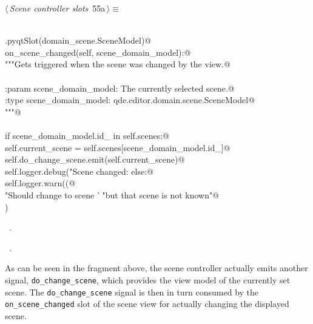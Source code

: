 \documentclass[
    a4paper,      %
    10pt,         %
    openright,    %
    notitlepage,  %
    parskip=half, %
]{scrreprt}       %
\theoremstyle{definition}                    %
\begin{document}
\begin{flushleft} \small
\begin{minipage}{\linewidth}\label{scrap87}\raggedright\small
{} $\langle\,${\itshape Scene controller slots}\nobreak\ {\footnotesize {55a}}$\,\rangle\equiv$
\vspace{-1ex}
\begin{list}{}{} \item
\mbox{}\lstinline@@\\
\mbox{}\lstinline@QtCore.pyqtSlot(domain_scene.SceneModel)@\\
\mbox{}\lstinline@def on_scene_changed(self, scene_domain_model):@\\
\mbox{}\lstinline@    """Gets triggered when the scene was changed by the view.@\\
\mbox{}\lstinline@@\\
\mbox{}\lstinline@    :param scene_domain_model: The currently selected scene.@\\
\mbox{}\lstinline@    :type  scene_domain_model: qde.editor.domain.scene.SceneModel@\\
\mbox{}\lstinline@    """@\\
\mbox{}\lstinline@@\\
\mbox{}\lstinline@    if scene_domain_model.id_ in self.scenes:@\\
\mbox{}\lstinline@        self.current_scene = self.scenes[scene_domain_model.id_]@\\
\mbox{}\lstinline@        self.do_change_scene.emit(self.current_scene)@\\
\mbox{}\lstinline@        self.logger.debug("Scene changed: %s", self.current_scene)@\\
\mbox{}\lstinline@    else:@\\
\mbox{}\lstinline@        self.logger.warn((@\\
\mbox{}\lstinline@            "Should change to scene '%s', "@\\
\mbox{}\lstinline@            "but that scene is not known"@\\
\mbox{}\lstinline@        ) % scene_domain_model)@\\
\mbox{}\lstinline@@{\NWsep}
\end{list}
\vspace{-1.5ex}
\footnotesize
\begin{list}{}{\setlength{\itemsep}{-\parsep}\setlength{\itemindent}{-\leftmargin}}
\item \NWtxtMacroDefBy\ .
\item \NWtxtMacroRefIn\ .

\item{}
\end{list}
\end{minipage}\vspace{4ex}
\end{flushleft}
As can be seen in the fragment above, the scene controller actually emits
another signal, \verb+do_change_scene+, which provides the view model of the
currently set scene.
The \verb+do_change_scene+ signal is then in turn consumed by the
\verb+on_scene_changed+ slot of the scene view for actually changing the
displayed scene.
\end{document}
